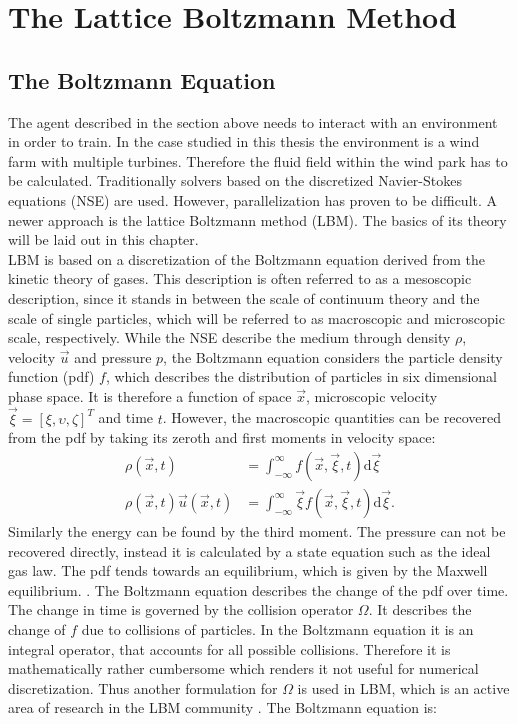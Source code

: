 \section{The Lattice Boltzmann Method}
\label{sec:LBM}
\subsection{The Boltzmann Equation}
The agent described in the section above needs to interact with an environment in order to train. In the case studied in this thesis the environment is a wind farm with multiple turbines. Therefore the fluid field within the wind park has to be calculated.
Traditionally solvers based on the discretized Navier-Stokes equations (NSE) are used. However, parallelization has proven to be difficult. A newer approach is the lattice Boltzmann method (LBM). The basics of its theory will be laid out in this chapter. \\
LBM is based on a discretization of the Boltzmann equation derived from the kinetic theory of gases. This description is often referred to as a mesoscopic description, since it stands in  between the scale of continuum theory and the scale of single particles, which will be referred to as macroscopic and microscopic scale, respectively. While the NSE describe the medium through density $\rho$, velocity $\vec{u}$ and pressure $p$, the Boltzmann equation considers the particle density function (pdf) $f$, which describes the distribution of particles in six dimensional phase space. It is therefore a function of space $\vec{x}$, microscopic velocity $\vec{\xi} = [\xi, \upsilon, \zeta]^T$ and time $t$. However, the macroscopic quantities can be recovered from the pdf by taking its zeroth and first moments in velocity space:
\begin{align}
	\rho(\vec{x}, t) &= \int_{-\infty}^{\infty} f(\vec{x}, \vec{\xi}, t) \mathrm{d}\vec{\xi} \label{eq:rho} \\
	\rho(\vec{x}, t) \vec{u}(\vec{x}, t) &= \int_{-\infty}^{\infty} \vec{\xi} f(\vec{x}, \vec{\xi}, t) \mathrm{d}\vec{\xi}. \label{eq:velocity}
\end{align}
Similarly the energy can be found by the third moment. The pressure can not be recovered directly, instead it is calculated by a state equation such as the ideal gas law. The pdf tends towards an equilibrium, which is given by the Maxwell equilibrium. .
The Boltzmann equation describes the change of the pdf over time. The change in time is governed by the collision operator $\Omega$. It describes the change of $f$ due to collisions of particles. In the Boltzmann equation it is an integral operator, that accounts for all possible collisions. Therefore it is mathematically rather cumbersome which renders it not useful for numerical discretization. Thus another formulation for $\Omega$ is used in LBM, which is an active area of research in the LBM community \cite{coreixas_comprehensive_2019}. The Boltzmann equation is:
